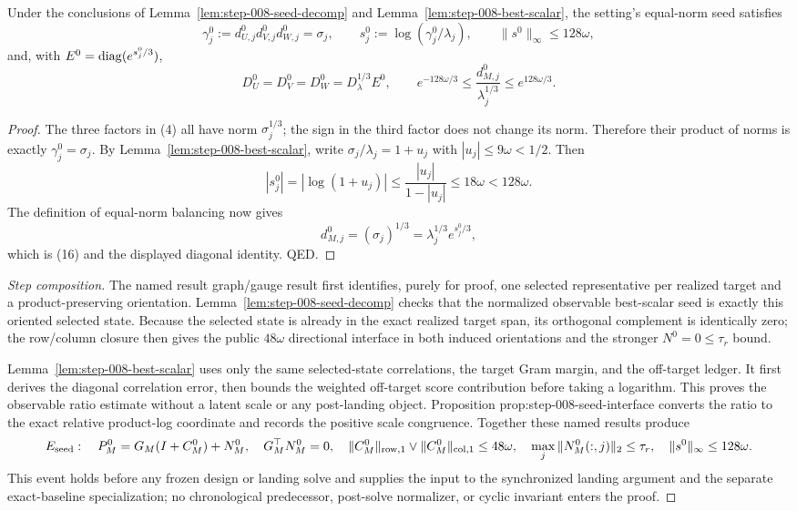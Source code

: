 \begin{proposition}\label{prop:step-008-seed-interface}
Under the conclusions of Lemma~\ref{lem:step-008-seed-decomp} and
Lemma~\ref{lem:step-008-best-scalar}, the
setting's equal-norm seed satisfies
\[
 \gamma_j^0:=d_{U,j}^0d_{V,j}^0d_{W,j}^0=\sigma_j,\qquad
 s_j^0:=\log(\gamma_j^0/\lambda_j),\qquad
 \|s^0\|_\infty\le128\omega, \tag{15}
\]
and, with $E^0={\rm diag}(e^{s_j^0/3})$,
\[
 D_U^0=D_V^0=D_W^0=D_\lambda^{1/3}E^0,\qquad
 e^{-128\omega/3}\le\frac{d_{M,j}^0}{\lambda_j^{1/3}}
 \le e^{128\omega/3}. \tag{16}
\]

\begin{proof}

The three factors in (4) all have norm $\sigma_j^{1/3}$; the sign in the
third factor does not change its norm. Therefore their product of norms is
exactly $\gamma_j^0=\sigma_j$. By Lemma~\ref{lem:step-008-best-scalar}, write
$\sigma_j/\lambda_j=1+u_j$ with $|u_j|\le9\omega<1/2$. Then
\[
 |s_j^0|=|\log(1+u_j)|
 \le\frac{|u_j|}{1-|u_j|}
 \le18\omega<128\omega. \tag{17}
\]
The definition of equal-norm balancing now gives
\[
 d_{M,j}^0=(\sigma_j)^{1/3}
 =\lambda_j^{1/3}e^{s_j^0/3},
\]
which is (16) and the displayed diagonal identity. QED.

\end{proof}
\end{proposition}
\begin{proof}[Step composition]
The named result graph/gauge result first identifies, purely for proof,
one selected representative per realized target and a product-preserving
orientation. Lemma~\ref{lem:step-008-seed-decomp} checks that the normalized
observable best-scalar seed is exactly this oriented selected state. Because
the selected state is already in the exact realized target span, its
orthogonal complement is identically zero; the row/column closure
then gives the public $48\omega$ directional interface in both induced
orientations and the stronger $N^0=0\le\tau_r$ bound.

Lemma~\ref{lem:step-008-best-scalar} uses only the same selected-state correlations,
the target Gram margin, and the off-target ledger. It first derives
the diagonal correlation error, then bounds the weighted off-target score
contribution before taking a logarithm. This proves the observable ratio
estimate without a latent scale or any post-landing object. Proposition
prop:step-008-seed-interface converts the ratio to the exact relative
product-log coordinate and records the positive scale congruence. Together
these named results produce
\[
 E_{\rm seed}:\quad
 P_M^0=G_M(I+C_M^0)+N_M^0,\quad G_M^\top N_M^0=0,\quad
 \|C_M^0\|_{\rm row,1}\vee\|C_M^0\|_{\rm col,1}\le48\omega,\quad
 \max_j\|N_M^0(:,j)\|_2\le\tau_r,\quad
 \|s^0\|_\infty\le128\omega.
\]
This event holds before any frozen design or landing solve and supplies the
input to the synchronized landing argument and the separate exact-baseline
specialization; no chronological predecessor, post-solve normalizer, or
cyclic invariant enters the proof.
\end{proof}

